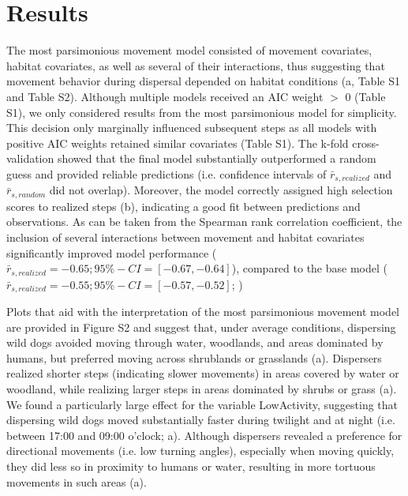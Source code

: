\documentclass[abstract=on,10pt,a4paper,bibliography=totocnumbered]{article}
\begin{document}
\section{Results}
The most parsimonious movement model consisted of movement covariates, habitat
covariates, as well as several of their interactions, thus suggesting that
movement behavior during dispersal depended on habitat conditions
(a, Table S1 and Table S2). Although multiple models
received an AIC weight \(>\) 0 (Table S1), we only considered results from the
most parsimonious model for simplicity. This decision only marginally influenced
subsequent steps as all models with positive AIC weights retained similar
covariates (Table S1). The k-fold cross-validation showed that the final model
substantially outperformed a random guess and provided reliable predictions
(i.e. confidence intervals of \(\bar{r}_{s, realized}\) and \(\bar{r}_{s,
random}\) did not overlap). Moreover, the model correctly assigned high
selection scores to realized steps (b), indicating a good
fit between predictions and observations. As can be taken from the Spearman rank
correlation coefficient, the inclusion of several interactions between movement
and habitat covariates significantly improved model performance (\(\bar{r}_{s,
realized} = -0.65; 95\%-CI = [-0.67, -0.64]\)), compared to the base model
(\(\bar{r}_{s, realized} = -0.55; 95\%-CI = [-0.57, -0.52]\);
\citealp{Hofmann.2021})

Plots that aid with the interpretation of the most parsimonious movement model
are provided in Figure S2 and suggest that, under average conditions, dispersing
wild dogs avoided moving through water, woodlands, and areas dominated by
humans, but preferred moving across shrublands or grasslands
(a). Dispersers realized shorter steps (indicating slower
movements) in areas covered by water or woodland, while realizing larger steps
in areas dominated by shrubs or grass (a). We found a
particularly large effect for the variable \textsf{LowActivity}, suggesting that
dispersing wild dogs moved substantially faster during twilight and at night
(i.e. between 17:00 and 09:00 o'clock; a). Although
dispersers revealed a preference for directional movements (i.e. low turning
angles), especially when moving quickly, they did less so in proximity to humans
or water, resulting in more tortuous movements in such areas
(a).
\end{document}
